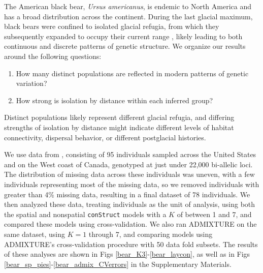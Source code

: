 \documentclass[10pt,letterpaper]{article}
\begin{document}
The American black bear, \textit{Ursus americanus}, is endemic to North America
and has a broad distribution across the continent.
During the last glacial maximum, 
black bears were confined to isolated glacial refugia, 
from which they subsequently expanded to occupy their current range
\cite{WoodingWard1997,Byun1997,Stone2000,Puckett2015},
likely leading to both continuous and discrete patterns of genetic structure.
We organize our results around the following questions:
\begin{enumerate}
    \item How many distinct populations
        are reflected in modern patterns of genetic variation?
    \item How strong is isolation by distance within each inferred group?
\end{enumerate}
Distinct populations likely represent different glacial refugia,
and differing strengths of isolation by distance might indicate 
different levels of habitat connectivity,
dispersal behavior,
or different postglacial histories.

We use data from \cite{Puckett2015}, consisting of 95 individuals 
sampled across the United States and on the West coast of Canada,
genotyped at just under 22,000 bi-allelic loci.
The distribution of missing data across these individuals was uneven, 
with a few individuals representing most of the missing data, 
so we removed individuals with greater than 4\% missing data, 
resulting in a final dataset of 78 individuals.
We then analyzed these data, treating individuals as the unit of analysis, 
using both the spatial and nonspatial \texttt{conStruct} models with a $K$ of between 1 and 7, 
and compared these models using cross-validation.
We also ran ADMIXTURE \cite{ADMIXTURE} on the same dataset, 
using $K = 1$ through 7, and comparing models using 
ADMIXTURE's cross-validation procedure with 50 data fold subsets.
The results of these analyses are shown in Figs \ref{bear_K3}-\ref{bear_laycon}, 
as well as in Figs \ref{bear_sp_pies}-\ref{bear_admix_CVerrors} in the Supplementary Materials.
\end{document}
